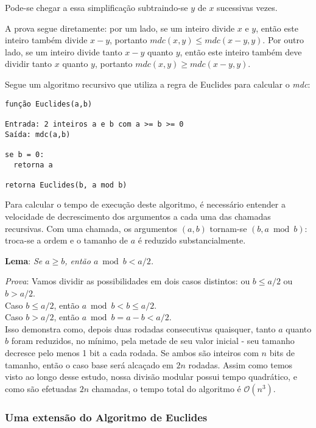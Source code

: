 Pode-se chegar a essa simplificação subtraindo-se $y$ de $x$ sucessivas vezes.

A prova segue diretamente: por um lado, se um inteiro divide $x$ e $y$, então este inteiro
também divide $x-y$, portanto $mdc(x,y) \leq mdc(x-y,y)$. Por outro lado, se
um inteiro divide tanto $x-y$ quanto $y$, então este inteiro também deve
dividir tanto $x$ quanto $y$, portanto $mdc(x,y) \geq mdc(x-y,y)$.

Segue um algoritmo recursivo que utiliza a regra de Euclides para calcular o
\textit{mdc}:

\begin{verbatim}
função Euclides(a,b)

Entrada: 2 inteiros a e b com a >= b >= 0
Saída: mdc(a,b)

se b = 0:
  retorna a

retorna Euclides(b, a mod b)

\end{verbatim}

Para calcular o tempo de execução deste algoritmo, é necessário entender a
velocidade de decrescimento dos argumentos a cada uma das chamadas recursivas.
Com uma chamada, os argumentos $(a,b)$ tornam-se $(b,a\bmod b)$: troca-se a
ordem e o tamanho de $a$ é reduzido substancialmente.

\textbf{Lema}: \textit{Se $a \geq b$, então $a \bmod b < a/2$.}

\textit{Prova}: Vamos dividir as possibilidades em dois casos distintos: ou $b
\leq a/2$ ou $b > a/2$.\\
Caso $b \leq a/2$, então $a \bmod b < b \leq a/2$.\\
Caso $b > a/2$, então $a \bmod b = a-b < a/2$.\\

Isso demonstra como, depois duas rodadas consecutivas quaisquer, tanto $a$
quanto $b$ foram reduzidos, no mínimo, pela metade de seu valor inicial - seu
tamanho decresce pelo menos 1 bit a cada rodada. Se ambos são inteiros com $n$
bits de tamanho, então o caso base será alcaçado em $2n$ rodadas. Assim como
temos visto ao longo desse estudo, nossa divisão modular possui tempo
quadrático, e como são efetuadas $2n$ chamadas, o tempo total do algoritmo é
$\mathcal{O}(n^3)$.


\vspace{1.3em}
\subsubsection*{Uma extensão do Algoritmo de Euclides}

